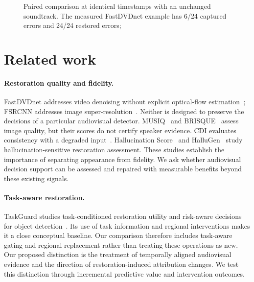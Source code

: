 \begin{figure}[t]
\centering
{}
\caption{Paired comparison at identical timestamps with an unchanged soundtrack. The measured FastDVDnet example has 6/24 captured errors and 24/24 restored errors; }
\label{fig:example}
\end{figure}

\section{Related work}
\paragraph{Restoration quality and fidelity.}
FastDVDnet addresses video denoising without explicit optical-flow estimation~\cite{fastdvd}; FSRCNN addresses image super-resolution~\cite{fsrcnn}. Neither is designed to preserve the decisions of a particular audiovisual detector. MUSIQ~\cite{musiq} and BRISQUE~\cite{brisque} assess image quality, but their scores do not certify speaker evidence. CDI evaluates consistency with a degraded input~\cite{cdi}. Hallucination Score~\cite{hs} and HalluGen~\cite{hallugen} study hallucination-sensitive restoration assessment. These studies establish the importance of separating appearance from fidelity. We ask whether audiovisual decision support can be assessed and repaired with measurable benefits beyond these existing signals.

\paragraph{Task-aware restoration.}
TaskGuard studies task-conditioned restoration utility and risk-aware decisions for object detection~\cite{taskguard}. Its use of task information and regional interventions makes it a close conceptual baseline. Our comparison therefore includes task-aware gating and regional replacement rather than treating these operations as new. Our proposed distinction is the treatment of temporally aligned audiovisual evidence and the direction of restoration-induced attribution changes. We test this distinction through incremental predictive value and intervention outcomes. 

